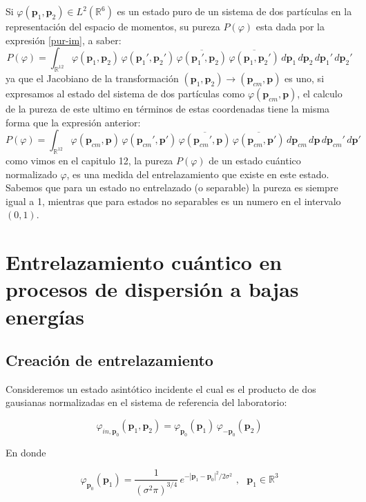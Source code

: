 \documentclass[12pt]{book}
\numberwithin{equation}{chapter}
\def\ol{\overline}
\def\R{\mathbb{R}}
\def\rar{\rightarrow}
\def\vp{\varphi}
\def\P{\mathbf{p}}
\begin{document}
Si $\varphi(\P_{1},\P_{2}) \in L^{2}(\R^{6})$ es un estado puro de un sistema de dos part\'iculas en la representaci\'on del espacio de momentos, su pureza $P(\varphi)$ esta dada por la expresi\'on \eqref{pur-im}, a saber:
$$ P(\varphi)= \int_{\R^{12}} \varphi(\P_{1},\P_{2}) \, \varphi(\P_{1}',\P_{2}') \, \ol{\varphi(\P_{1}',\P_{2})} \, \ol{\varphi(\P_{1},\P_{2}')}\, d\P_{1}\, d\P_{2}\, d\P_{1}' \, d\P_{2}' $$
ya que el Jacobiano de la transformaci\'on $( \P_{1},\P_{2} ) \rar (\P_{cm},\P) $ es uno, si expresamos al estado del sistema de dos part\'iculas como $\varphi(\P_{cm},\P)$, el calculo de la pureza de este ultimo en t\'erminos de estas coordenadas tiene la misma forma que la expresi\'on anterior:
$$ P(\varphi)= \int_{\R^{12}} \varphi(\P_{cm},\P) \, \varphi(\P_{cm}',\P') \, \ol{\varphi(\P_{cm}',\P)} \, \ol{\varphi(\P_{cm},\P')}\, d\P_{cm}\,d\P\,d\P_{cm}' \,d\P' $$
como vimos en el capitulo 12, la pureza $P(\varphi)$ de un estado cu\'antico normalizado $\varphi$, es una medida del entrelazamiento que existe en este estado. Sabemos que para un estado no entrelazado (o separable) la pureza es siempre igual a 1, mientras que para estados no separables es un numero en el intervalo $(0,1)$.\\

\newpage

\part{Entrelazamiento cu\'antico en procesos de dispersi\'on a bajas energ\'ias}

\chapter{Creaci\'on de entrelazamiento}

Consideremos un estado asint\'otico incidente el cual es el producto de dos gausianas normalizadas en el sistema de referencia del laboratorio:

\begin{equation}\label{estin}
\vp_{in,\P_{0} }(\P_{1},\P_{2}) = \vp_{\P_{0}}(\P_{1})\, \vp_{-\P_{0}}(\P_{2})
\end{equation}

En donde

\begin{equation}\label{estin1}
\vp_{\P_{0}}(\P_{1})= \frac{1}{( \sigma^{2} \pi )^{3/4}}\,
e^{-| \P_{1} - \P_{0} |^{2}/2 \sigma^{2}} \,\,,\,\,\,\, \P_{1} \in \R^{3}
\end{equation}
\end{document}

